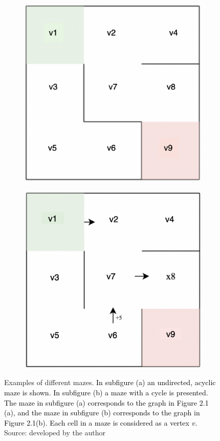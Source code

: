  \begin{figure}[!h]
	\centering
	\begin{subfigure}{.45\textwidth}
	  \centering
	  \includegraphics[width=.6\linewidth]{undirectedmaze}
	  \caption{}
	  \label{fig:sub1}
	\end{subfigure}
	\begin{subfigure}{.45\textwidth}
	  \centering
	  \includegraphics[width=.6\linewidth]{cyclicmaze}
	  \caption{}
	  \label{fig:sub2}
	\end{subfigure}
	\caption{Examples of different mazes. \textcolor{black}{In subfigure (a) an undirected, acyclic maze is shown. In subfigure (b) a maze with a cycle is presented. The maze in subfigure (a) corresponds to the graph in Figure 2.1 (a), and the maze in subfigure (b) corresponds to the graph in Figure 2.1(b). Each cell in a maze is considered as a vertex $v$.}\\Source: developed by the author}
	\label{fig:test}
	\end{figure}	

